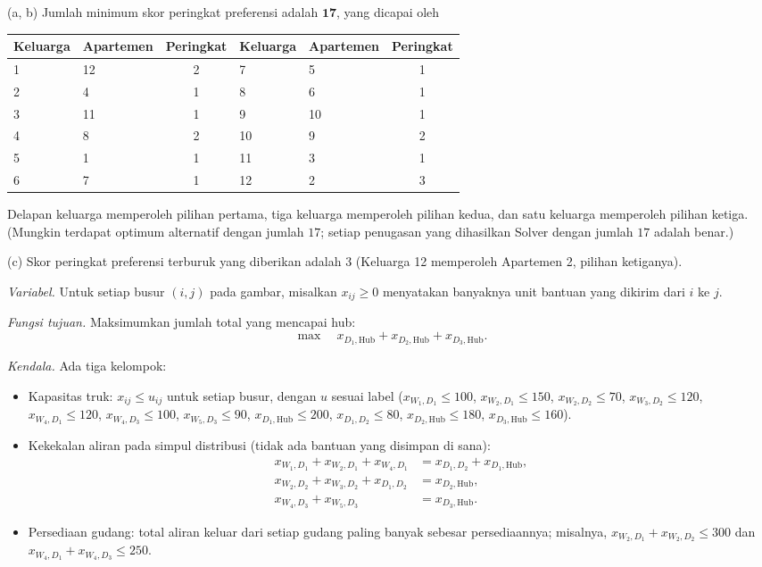 (a, b) Jumlah minimum skor peringkat preferensi adalah $\mathbf{17}$, yang dicapai oleh
\begin{center}
\begin{tabular}{llc|llc}
Keluarga & Apartemen & Peringkat & Keluarga & Apartemen & Peringkat\\
\hline
1 & 12 & 2 & 7 & 5 & 1\\
2 & 4 & 1 & 8 & 6 & 1\\
3 & 11 & 1 & 9 & 10 & 1\\
4 & 8 & 2 & 10 & 9 & 2\\
5 & 1 & 1 & 11 & 3 & 1\\
6 & 7 & 1 & 12 & 2 & 3\\
\end{tabular}
\end{center}
Delapan keluarga memperoleh pilihan pertama, tiga keluarga memperoleh pilihan kedua, dan satu keluarga memperoleh pilihan ketiga. (Mungkin terdapat optimum alternatif dengan jumlah $17$; setiap penugasan yang dihasilkan Solver dengan jumlah $17$ adalah benar.)

(c) Skor peringkat preferensi terburuk yang diberikan adalah $3$ (Keluarga 12 memperoleh Apartemen 2, pilihan ketiganya).


\emph{Variabel.} Untuk setiap busur $(i,j)$ pada gambar, misalkan $x_{ij} \geq 0$ menyatakan banyaknya unit bantuan yang dikirim dari $i$ ke $j$.

\emph{Fungsi tujuan.} Maksimumkan jumlah total yang mencapai hub:
\[
\max \quad x_{D_1,\mathrm{Hub}} + x_{D_2,\mathrm{Hub}} + x_{D_3,\mathrm{Hub}}.
\]

\emph{Kendala.} Ada tiga kelompok:
\begin{itemize}
\item Kapasitas truk: $x_{ij} \leq u_{ij}$ untuk setiap busur, dengan $u$ sesuai label ($x_{W_1,D_1} \leq 100$, $x_{W_2,D_1} \leq 150$, $x_{W_2,D_2} \leq 70$, $x_{W_3,D_2} \leq 120$, $x_{W_4,D_1} \leq 120$, $x_{W_4,D_3} \leq 100$, $x_{W_5,D_3} \leq 90$, $x_{D_1,\mathrm{Hub}} \leq 200$, $x_{D_1,D_2} \leq 80$, $x_{D_2,\mathrm{Hub}} \leq 180$, $x_{D_3,\mathrm{Hub}} \leq 160$).
\item Kekekalan aliran pada simpul distribusi (tidak ada bantuan yang disimpan di sana):
\begin{align*}
x_{W_1,D_1} + x_{W_2,D_1} + x_{W_4,D_1} &= x_{D_1,D_2} + x_{D_1,\mathrm{Hub}},\\
x_{W_2,D_2} + x_{W_3,D_2} + x_{D_1,D_2} &= x_{D_2,\mathrm{Hub}},\\
x_{W_4,D_3} + x_{W_5,D_3} &= x_{D_3,\mathrm{Hub}}.
\end{align*}
\item Persediaan gudang: total aliran keluar dari setiap gudang paling banyak sebesar persediaannya; misalnya, $x_{W_2,D_1} + x_{W_2,D_2} \leq 300$ dan $x_{W_4,D_1} + x_{W_4,D_3} \leq 250$.
\end{itemize}

